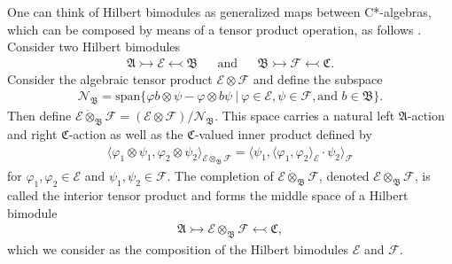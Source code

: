 \documentclass[sn-mathphys,Numbered]{sn-jnl}
\providecommand{\inner}[2]{\langle#1,#2\rangle}
\begin{document}
 One can think of Hilbert bimodules as generalized maps between C*-algebras, which can be composed by means of a tensor product operation, as follows \citep{La01b,La01c}.  Consider two Hilbert bimodules
 \begin{align}
\mathfrak{A}\rightarrowtail\mathcal{E}\leftarrowtail\mathfrak{B} && \text{and} && \mathfrak{B}\rightarrowtail\mathcal{F}\leftarrowtail\mathfrak{C}.
 \end{align}
Consider the algebraic tensor product $\mathcal{E}\otimes \mathcal{F}$ and define the subspace
\begin{align}
    \mathcal{N}_\mathfrak{B} = \text{span}\Big\{\varphi b\otimes \psi - \varphi\otimes b\psi\ \Big|\ \varphi\in\mathcal{E}, \psi\in\mathcal{F}, \text{and }b\in\mathfrak{B}\Big\}.
\end{align}
Then define $\mathcal{E}\dot{\otimes}_{\mathfrak{B}} \mathcal{F} = (\mathcal{E}\otimes\mathcal{F})/\mathcal{N}_\mathfrak{B}$.  This space carries a natural left $\mathfrak{A}$-action and right $\mathfrak{C}$-action as well as the $\mathfrak{C}$-valued inner product defined by
\begin{align}
    \inner{\varphi_1\otimes \psi_1}{\varphi_2\otimes\psi_2}_{\mathcal{E}\dot{\otimes}_\mathfrak{B}\mathcal{F}} = \inner{\psi_1}{\inner{\varphi_1}{\varphi_2}_{\mathcal{E}}\cdot\psi_2}_{\mathcal{F}}
\end{align}
for $\varphi_1,\varphi_2\in\mathcal{E}$ and $\psi_1,\psi_2\in\mathcal{F}$.  The completion of $\mathcal{E}\dot{\otimes}_{\mathfrak{B}}\mathcal{F}$, denoted $\mathcal{E}\otimes_\mathfrak{B}\mathcal{F}$, is called the interior tensor product and forms the middle space of a Hilbert bimodule
\begin{align}
    \mathfrak{A}\rightarrowtail\mathcal{E}\otimes_\mathfrak{B}\mathcal{F}\leftarrowtail\mathfrak{C},
\end{align}
which we consider as the composition of the Hilbert bimodules $\mathcal{E}$ and $\mathcal{F}$.
\end{document}
